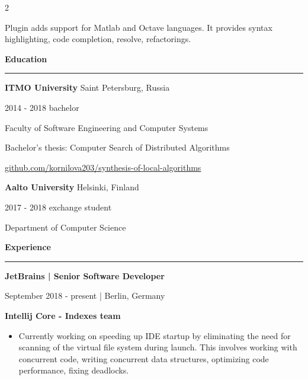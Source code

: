 \documentclass[9pt]{article}
\begin{document}
\begin{multicols}{2}
\vspace{0.3em}

Plugin adds support for Matlab and Octave languages. It provides syntax highlighting, code completion, resolve, refactorings.

\vspace{2em}
{\textbf{Education}}
\vspace{0.5em}
\hrule
\vspace{1em}

{\textbf{ITMO University}} \color{gray} Saint Petersburg, Russia \color{black}

\color{gray} 2014 - 2018 bachelor \color{black}
\vspace{0.3em}

Faculty of Software Engineering and Computer Systems

Bachelor’s thesis: Computer Search of Distributed Algorithms

\href{https://github.com/kornilova203/synthesis-of-local-algorithms}{github.com/kornilova203/synthesis-of-local-algorithms}


\vspace{2em}

{\textbf{Aalto University}} \color{gray} Helsinki, Finland \color{black}

\color{gray} 2017 - 2018 exchange student \color{black}
\vspace{0.3em}

Department of Computer Science


\columnbreak

\vspace{0.5em}

{\textbf{Experience}}

\vspace{0.5em}

\hrule

\vspace{1em}

{\textbf{JetBrains | Senior Software Developer}}

\color{gray} September 2018 - present | Berlin, Germany \color{black}

\vspace{1.3em}
\hspace{2.2em} {\textbf{Intellij Core - Indexes team}}
\begin{itemize}
    \item Currently working on speeding up IDE startup by eliminating the need for scanning of the virtual file system during launch. This involves working with concurrent code, writing concurrent data structures, optimizing code performance, fixing deadlocks.
\end{itemize}


\end{multicols}
\end{document}
